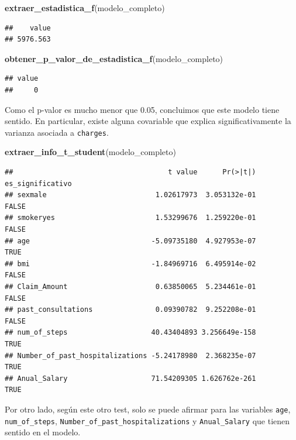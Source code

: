 \documentclass[
]{article}
\newenvironment{Shaded}{\begin{snugshade}}{\end{snugshade}}
\newcommand{\FunctionTok}[1]{\textcolor[rgb]{0.13,0.29,0.53}{\textbf{#1}}}
\newcommand{\NormalTok}[1]{#1}
\begin{document}
\begin{Shaded}
\begin{Highlighting}[]
\FunctionTok{extraer\_estadistica\_f}\NormalTok{(modelo\_completo)}
\end{Highlighting}
\end{Shaded}

\begin{verbatim}
##    value 
## 5976.563
\end{verbatim}

\begin{Shaded}
\begin{Highlighting}[]
\FunctionTok{obtener\_p\_valor\_de\_estadistica\_f}\NormalTok{(modelo\_completo)}
\end{Highlighting}
\end{Shaded}

\begin{verbatim}
## value 
##     0
\end{verbatim}

Como el p-valor es mucho menor que 0.05, concluimos que este modelo
tiene sentido. En particular, existe alguna covariable que explica
significativamente la varianza asociada a \texttt{charges}.

\begin{Shaded}
\begin{Highlighting}[]
\FunctionTok{extraer\_info\_t\_student}\NormalTok{(modelo\_completo)}
\end{Highlighting}
\end{Shaded}

\begin{verbatim}
##                                     t value      Pr(>|t|) es_significativo
## sexmale                          1.02617973  3.053132e-01            FALSE
## smokeryes                        1.53299676  1.259220e-01            FALSE
## age                             -5.09735180  4.927953e-07             TRUE
## bmi                             -1.84969716  6.495914e-02            FALSE
## Claim_Amount                     0.63850065  5.234461e-01            FALSE
## past_consultations               0.09390782  9.252208e-01            FALSE
## num_of_steps                    40.43404893 3.256649e-158             TRUE
## Number_of_past_hospitalizations -5.24178980  2.368235e-07             TRUE
## Anual_Salary                    71.54209305 1.626762e-261             TRUE
\end{verbatim}

Por otro lado, según este otro test, solo se puede afirmar para las
variables \texttt{age}, \texttt{num\_of\_steps},
\texttt{Number\_of\_past\_hospitalizations} y \texttt{Anual\_Salary} que
tienen sentido en el modelo.
\end{document}
